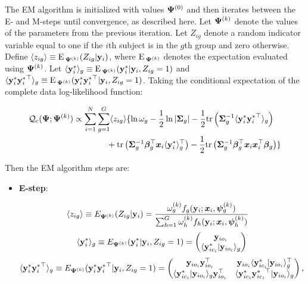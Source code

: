 \documentclass{interact}
\theoremstyle{plain}
\theoremstyle{definition}
\theoremstyle{remark}
\begin{document}
The EM algorithm is initialized with values $\bm{\Psi}^{(0)}$ and then iterates between the E- and M-steps until convergence, as described here. Let $\bm{\Psi}^{(k)}$ denote the values of the parameters from the previous iteration. Let $Z_{ig}$ denote a random indicator variable equal to one if the $i$th subject is in the $g$th group and zero otherwise. Define $\langle z_{ig}\rangle \equiv {\rm E}\,_{\bm{\Psi}^{(k)}}(Z_{ig}|\mathbf{y}_i)$, where ${\rm E}\,_{\bm{\Psi}^{(k)}}$ denotes the expectation evaluated using $\bm{\Psi}^{(k)}$. Let $\langle{\mathbf{y}_i^*}\rangle_g\equiv {\rm E}\,_{\bm{\Psi}^{(k)}}(\mathbf{y}_i^*|\mathbf{y}_i,Z_{ig}=1)$ and $\langle {\mathbf{y}_i^*{\mathbf{y}_i^*}^\top}\rangle_g\equiv {\rm E}\,_{\bm{\Psi}^{(k)}}(\mathbf{y}_i^*{\mathbf{y}_i^*}^\top|\mathbf{y}_i,Z_{ig}=1)$. Taking the conditional expectation of the complete data log-likelihood function:
\begin{linenomath}
\begin{align}
\begin{split}
    \mathcal{Q}_c(\bm{\Psi};\bm{\Psi}^{(k)})
    &\propto \sum_{i=1}^N\sum_{g=1}^G\langle z_{ig}\rangle\{\ln \omega_g-\frac{1}{2}\ln{|\bm{\Sigma}_g|}-\frac{1}{2}\mathrm{tr}\left(\bm{\Sigma}_g^{-1}\langle \mathbf{y}_i^*{\mathbf{y}_i^*}^\top\rangle_g\right)\\
    &\qquad\qquad+\mathrm{tr}\left(\bm{\Sigma}_g^{-1}{\bm \beta}_g^\top\bm{x}_i\langle {\mathbf{y}_i^*}\rangle_g^\top\right)-\frac{1}{2}\mathrm{tr}\left(\bm{\Sigma}_g^{-1}{\bm \beta}_g^\top\bm{x}_i\bm{x}_i^\top{\bm \beta}_g\right)\}
\end{split}
\end{align}
\end{linenomath}
Then the EM algorithm steps are:
\begin{itemize}
    \item \textbf{E-step}:
    \begin{linenomath}
    \begin{align}
    \langle z_{ig}\rangle &\equiv E_{\bm{\Psi}^{(k)}}(Z_{ig}|\mathbf{y}_i)=\frac{\omega_g^{(k)}f_g(\mathbf{y}_i;\bm{x}_i,\bm{\psi}_g^{(k)})}{\sum_{h=1}^{G}\omega_h^{(k)}f_h(\mathbf{y}_i;\bm{x}_i,\bm{\psi}_h^{(k)})}
    \end{align}
    \begin{align}
    \langle {\mathbf{y}_i^*}\rangle_g\equiv E_{\bm{\Psi}^{(k)}}(\mathbf{y}_i^*|\mathbf{y}_i,Z_{ig}=1)=
    \begin{pmatrix}
                \mathbf{y}_{io_{i}}\\
                \langle \mathbf{y}_{ic_{i}}^*|\mathbf{y}_{io_{i}} \rangle_g
            \end{pmatrix}
    \end{align}
    \begin{align}
    \langle {\mathbf{y}_i^*{\mathbf{y}_i^*}^\top}\rangle_g\equiv E_{\bm{\Psi}^{(k)}}(\mathbf{y}_i^*{\mathbf{y}_i^*}^\top|\mathbf{y}_i,Z_{ig}=1)=
    \begin{pmatrix}
                \mathbf{y}_{io_{i}}\mathbf{y}_{io_{i}}^\top & \mathbf{y}_{io_{i}}\langle\mathbf{y}_{ic_{i}}^*|\mathbf{y}_{io_{i}}\rangle_g^\top\\
                \langle\mathbf{y}_{ic_{i}}^*|\mathbf{y}_{io_{i}}\rangle_g \mathbf{y}_{io_{i}}^\top & \langle \mathbf{y}_{ic_{i}}^* {\mathbf{y}_{ic_{i}}^*}^\top|\mathbf{y}_{io_{i}} \rangle_g
            \end{pmatrix},
    \end{align}
    \end{linenomath}
\end{itemize}
\end{document}
